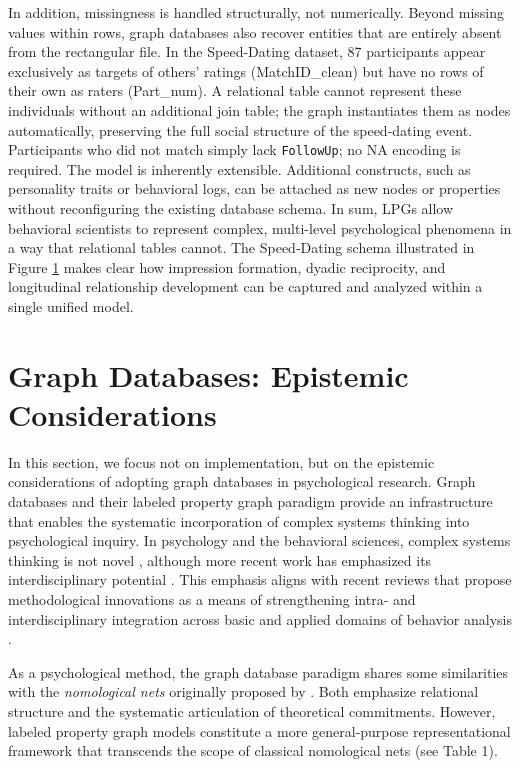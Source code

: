 \documentclass[sn-apa,pdflatex]{sn-jnl}
\theoremstyle{remark}
\theoremstyle{definition}
\begin{document}
In addition, missingness is handled structurally, not numerically.
Beyond missing values within rows, graph databases also recover entities
that are entirely absent from the rectangular file. In the Speed-Dating
dataset, 87 participants appear exclusively as targets of others'
ratings (MatchID\_clean) but have no rows of their own as raters
(Part\_num). A relational table cannot represent these individuals
without an additional join table; the graph instantiates them as nodes
automatically, preserving the full social structure of the speed-dating
event. Participants who did not match simply lack \texttt{FollowUp}; no
NA encoding is required. The model is inherently extensible. Additional
constructs, such as personality traits or behavioral logs, can be
attached as new nodes or properties without reconfiguring the existing
database schema. In sum, LPGs allow behavioral scientists to represent
complex, multi-level psychological phenomena in a way that relational
tables cannot. The Speed‑Dating schema illustrated in Figure
\hyperref[fig:F2]{1} makes clear how impression formation, dyadic
reciprocity, and longitudinal relationship development can be captured
and analyzed within a single unified model.

\section{Graph Databases: Epistemic
Considerations}\label{graph-databases-epistemic-considerations}

In this section, we focus not on implementation, but on the epistemic
considerations of adopting graph databases in psychological research.
Graph databases and their labeled property graph paradigm provide an
infrastructure that enables the systematic incorporation of complex
systems thinking into psychological inquiry. In psychology and the
behavioral sciences, complex systems thinking is not novel
\citep{Luce1999, Guastello2009}, although more recent work has
emphasized its interdisciplinary potential \citep{Krakauer2019}. This
emphasis aligns with recent reviews that propose methodological
innovations as a means of strengthening intra- and interdisciplinary
integration across basic and applied domains of behavior analysis
\citep{Elcoro2023}.

As a psychological method, the graph database paradigm shares some
similarities with the \emph{nomological nets} originally proposed by
\citet{cronbach1955}. Both emphasize relational structure and the
systematic articulation of theoretical commitments. However, labeled
property graph models constitute a more general-purpose representational
framework that transcends the scope of classical nomological nets (see
Table 1).
\end{document}
